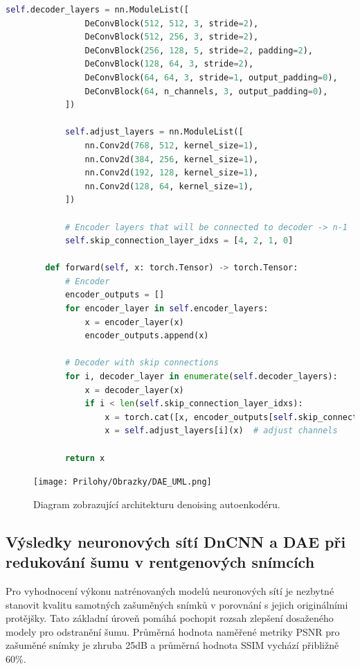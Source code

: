 \documentclass[male,czech,api_ing]{thesis}
\begin{document}
\begin{lstlisting}[language=Python, caption={Implementace autoenkodéru pro redukci šumu}, label={lst:DAEClass}]
            self.decoder_layers = nn.ModuleList([
                DeConvBlock(512, 512, 3, stride=2),
                DeConvBlock(512, 256, 3, stride=2),
                DeConvBlock(256, 128, 5, stride=2, padding=2),
                DeConvBlock(128, 64, 3, stride=2),
                DeConvBlock(64, 64, 3, stride=1, output_padding=0),
                DeConvBlock(64, n_channels, 3, output_padding=0),
            ])
            
            self.adjust_layers = nn.ModuleList([
                nn.Conv2d(768, 512, kernel_size=1),
                nn.Conv2d(384, 256, kernel_size=1),
                nn.Conv2d(192, 128, kernel_size=1),
                nn.Conv2d(128, 64, kernel_size=1),
            ])

            # Encoder layers that will be connected to decoder -> n-1
            self.skip_connection_layer_idxs = [4, 2, 1, 0]

        def forward(self, x: torch.Tensor) -> torch.Tensor:
            # Encoder
            encoder_outputs = []
            for encoder_layer in self.encoder_layers:
                x = encoder_layer(x)
                encoder_outputs.append(x)
            
            # Decoder with skip connections
            for i, decoder_layer in enumerate(self.decoder_layers):
                x = decoder_layer(x)
                if i < len(self.skip_connection_layer_idxs):
                    x = torch.cat([x, encoder_outputs[self.skip_connection_layer_idxs[i]]], dim=1)  # skip connections
                    x = self.adjust_layers[i](x)  # adjust channels
            
            return x
\end{lstlisting}

\begin{figure}[h]
    \centering
    \texttt{[image: Prilohy/Obrazky/DAE\_UML.png]}
    \caption{Diagram zobrazující architekturu denoising autoenkodéru.}
    \label{fig:DAE}
\end{figure}

\subsection{Výsledky neuronových sítí DnCNN a DAE při redukování šumu v rentgenových snímcích}
Pro vyhodnocení výkonu natrénovaných modelů neuronových sítí je nezbytné stanovit kvalitu samotných zašuměných snímků v porovnání s jejich originálními protějšky. Tato základní úroveň pomáhá pochopit rozsah zlepšení dosaženého modely pro odstranění šumu. Průměrná hodnota naměřené metriky PSNR pro zašuměné snímky je zhruba 25dB a průměrná hodnota SSIM vychází přibližně 60\%.
\end{document}
